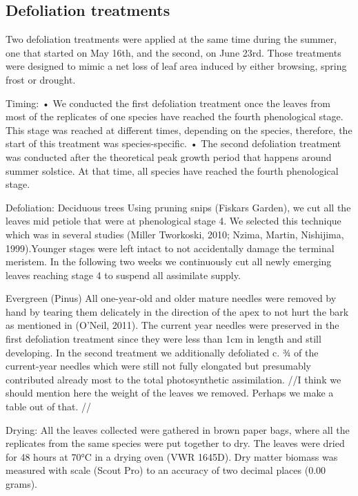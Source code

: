 \documentclass{article}
\begin{document}
	
	
	\subsection*{Defoliation treatments}
	Two defoliation treatments were applied at the same time during the summer, one that started on May 16th, and the second, on June 23rd. Those treatments were designed to mimic a net loss of leaf area induced by either browsing, spring frost or drought. 
	
	Timing:
	•	We conducted the first defoliation treatment once the leaves from most of the replicates of one species have reached the fourth phenological stage. This stage was reached at different times, depending on the species, therefore, the start of this treatment was species-specific. 
	•	The second defoliation treatment was conducted after the theoretical peak growth period that happens around summer solstice. At that time, all species have reached the fourth phenological stage. 
	
	Defoliation:
	Deciduous trees 
	Using pruning snips (Fiskars Garden), we cut all the leaves mid petiole that were at phenological stage 4. We selected this technique which was in several studies (Miller Tworkoski, 2010; Nzima, Martin, Nishijima, 1999).Younger stages were left intact to not accidentally damage the terminal meristem. In the following two weeks we continuously cut all newly emerging leaves reaching stage 4 to suspend all assimilate supply.
	
	Evergreen (Pinus)
	All one-year-old and older mature needles were removed by hand by tearing them delicately in the direction of the apex to not hurt the bark as mentioned in (O’Neil, 2011). The current year needles were preserved in the first defoliation treatment since they were less than 1cm in length and still developing. In the second treatment we additionally defoliated c. ¾ of the current-year needles which were still not fully elongated but presumably contributed already most to the total photosynthetic assimilation.
	//I think we should mention here the weight of the leaves we removed. Perhaps we make a table out of that. //
	
	Drying:
	All the leaves collected were gathered in brown paper bags, where all the replicates from the same species were put together to dry. The leaves were dried for 48 hours at 70°C in a drying oven (VWR 1645D). Dry matter biomass was measured with scale (Scout Pro) to an accuracy of two decimal places (0.00 grams).
	
\end{document}
